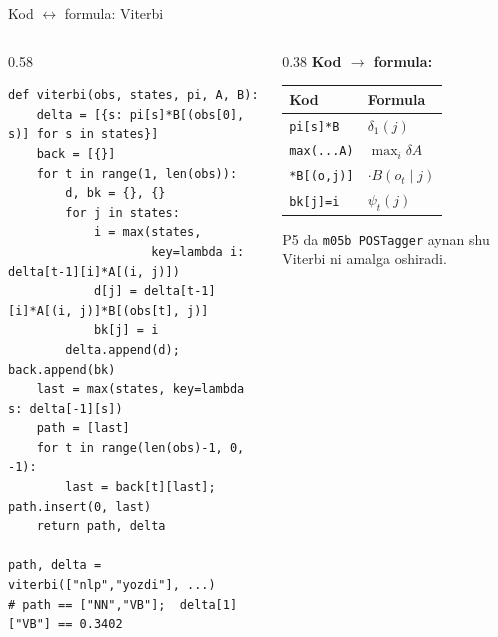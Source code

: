 \documentclass[aspectratio=169,11pt]{beamer}
\begin{document}
\begin{frame}[fragile]{Kod $\leftrightarrow$ formula: Viterbi}
  \begin{columns}[T]
    \begin{column}{0.58\textwidth}
\begin{lstlisting}
def viterbi(obs, states, pi, A, B):
    delta = [{s: pi[s]*B[(obs[0], s)] for s in states}]
    back = [{}]
    for t in range(1, len(obs)):
        d, bk = {}, {}
        for j in states:
            i = max(states,
                    key=lambda i: delta[t-1][i]*A[(i, j)])
            d[j] = delta[t-1][i]*A[(i, j)]*B[(obs[t], j)]
            bk[j] = i
        delta.append(d); back.append(bk)
    last = max(states, key=lambda s: delta[-1][s])
    path = [last]
    for t in range(len(obs)-1, 0, -1):
        last = back[t][last]; path.insert(0, last)
    return path, delta

path, delta = viterbi(["nlp","yozdi"], ...)
# path == ["NN","VB"];  delta[1]["VB"] == 0.3402
\end{lstlisting}
    \end{column}
    \begin{column}{0.38\textwidth}
      \textbf{Kod $\to$ formula:}\\[3pt]
      \footnotesize
      \begin{tabular}{p{1.7cm}p{1.9cm}}
        \toprule
        Kod & Formula \\
        \midrule
        \texttt{pi[s]*B} & $\delta_1(j)$ \\
        \texttt{max(...A)} & $\max_i \delta A$ \\
        \texttt{*B[(o,j)]} & $\cdot B(o_t{\mid}j)$ \\
        \texttt{bk[j]=i} & $\psi_t(j)$ \\
        \bottomrule
      \end{tabular}
      \vspace{4pt}
      \begin{tcolorbox}[okbox,top=2pt,bottom=2pt]
        \footnotesize
        P5 da \texttt{m05b POSTagger} aynan shu Viterbi ni amalga oshiradi.
      \end{tcolorbox}
    \end{column}
  \end{columns}
\end{frame}
\end{document}
